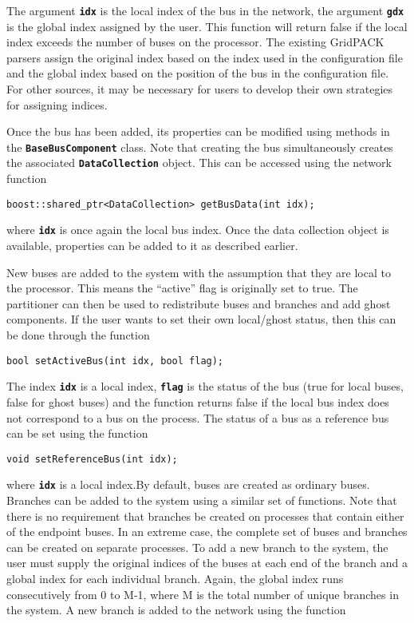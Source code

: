 The argument \texttt{\textbf{idx}} is the local index of the bus in the network, the argument \texttt{\textbf{gdx}} is the global index assigned by the user. This function will return false if the local index exceeds the number of buses on the processor. The existing GridPACK parsers assign the original index based on the index used in the configuration file and the global index based on the position of the bus in the configuration file. For other sources, it may be necessary for users to develop their own strategies for assigning indices.

Once the bus has been added, its properties can be modified using methods in the \texttt{\textbf{BaseBusComponent}} class. Note that creating the bus simultaneously creates the associated \texttt{\textbf{DataCollection}} object. This can be accessed using the network function

{
\color{red}
\begin{Verbatim}[fontseries=b]
boost::shared_ptr<DataCollection> getBusData(int idx);
\end{Verbatim}
}

where \texttt{\textbf{idx}} is once again the local bus index. Once the data collection object is available, properties can be added to it as described earlier.

New buses are added to the system with the assumption that they are local to the processor. This means the ``active'' flag is originally set to true. The partitioner can then be used to redistribute buses and branches and add ghost components. If the user wants to set their own local/ghost status, then this can be done through the function

{
\color{red}
\begin{Verbatim}[fontseries=b]
bool setActiveBus(int idx, bool flag);
\end{Verbatim}
}

The index \texttt{\textbf{idx}} is a local index, \texttt{\textbf{flag}} is the status of the bus (true for local buses, false for ghost buses) and the function returns false if the local bus index does not correspond to a bus on the process.
The status of a bus as a reference bus can be set using the function

{
\color{red}
\begin{Verbatim}[fontseries=b]
void setReferenceBus(int idx);
\end{Verbatim}
}

where \texttt{\textbf{idx}} is a local index.By default, buses are created as ordinary buses.
Branches can be added to the system using a similar set of functions. Note that there is no requirement that branches be created on processes that contain either of the endpoint buses. In an extreme case, the complete set of buses and branches can be created on separate processes. To add a new branch to the system, the user must supply the original indices of the buses at each end of the branch and a global index for each individual branch. Again, the global index runs consecutively from 0 to M-1, where M is the total number of unique branches in the system. A new branch is added to the network using the function

